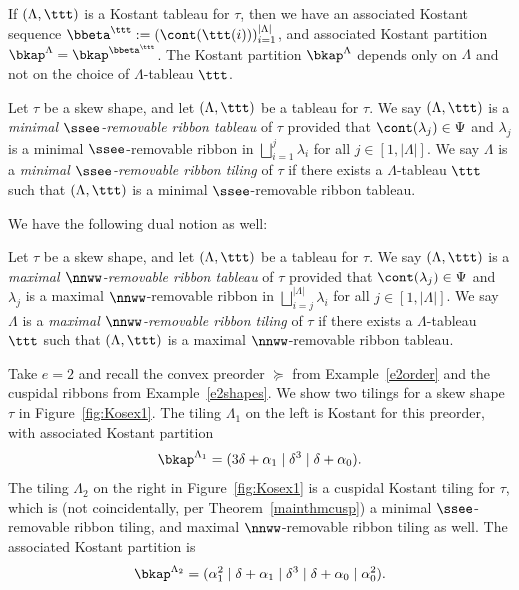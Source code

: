 If \((\Lambda,\ttt)\) is a Kostant tableau for \(\tau\), then we have an associated Kostant sequence \(\bbeta^{\ttt}:= (\cont(\ttt(i)))_{i=1}^{|\Lambda|}\), and associated Kostant partition \(\bkap^\Lambda = \bkap^{\bbeta^{\ttt}}\). The Kostant partition \(\bkap^\Lambda\) depends only on \(\Lambda\) and not on the choice of \(\Lambda\)-tableau \(\ttt\).

\begin{defi}
Let \(\tau\) be a skew shape, and let \((\Lambda,\ttt)\) be a tableau for \(\tau\). 
We say \((\Lambda,\ttt)\) is a {\em minimal \(\ssee\)-removable ribbon tableau} of \(\tau\) provided that \(\cont(\lambda_j) \in \Psi\) and \(\lambda_j\) is a minimal \(\ssee\)-removable ribbon in \(\bigsqcup_{i=1}^j \lambda_i\) for all \(j \in [1, |\Lambda|]\). We say \(\Lambda\) is a {\em minimal \(\ssee\)-removable ribbon tiling} of \(\tau\) if there exists a \(\Lambda\)-tableau \(\ttt\) such that \((\Lambda, \ttt)\) is a minimal \(\ssee\)-removable ribbon tableau.
\end{defi}

We have the following dual notion as well:

\begin{defi}
Let \(\tau\) be a skew shape, and let \((\Lambda,\ttt)\) be a tableau for \(\tau\). 
We say \((\Lambda,\ttt)\) is a {\em maximal \(\nnww\)-removable ribbon tableau} of \(\tau\) provided that \(\cont(\lambda_j) \in \Psi\) and \(\lambda_j\) is a maximal \(\nnww\)-removable ribbon in \(\bigsqcup_{i=j}^{|\Lambda|} \lambda_i\) for all \(j \in [1, |\Lambda|]\). We say \(\Lambda\) is a {\em maximal \(\nnww\)-removable ribbon tiling} of \(\tau\) if there exists a \(\Lambda\)-tableau \(\ttt\) such that \((\Lambda, \ttt)\) is a maximal \(\nnww\)-removable ribbon tableau.
\end{defi}

\begin{exam}\label{e2Kosex}
Take \(e=2\) and recall the convex preorder \(\succeq\) from Example~\ref{e2order} and the cuspidal ribbons from Example~\ref{e2shapes}. We show two tilings for a skew shape \(\tau\) in Figure~\ref{fig:Kosex1}. The tiling \(\Lambda_1\) on the left is Kostant for this preorder, with associated Kostant partition
\begin{align*}
\bkap^{\Lambda_1} = ( 3\delta + \alpha_1 \mid  \delta^3 \mid \delta + \alpha_0).
\end{align*}
The tiling \(\Lambda_2\) on the right in Figure~\ref{fig:Kosex1} is a cuspidal Kostant tiling for \(\tau\), which is (not coincidentally, per Theorem~\ref{mainthmcusp}) a minimal \(\ssee\)-removable ribbon tiling, and maximal \(\nnww\)-removable ribbon tiling as well. The associated Kostant partition is
\begin{align*}
\bkap^{\Lambda_2} = (\alpha_1^2 \mid \delta + \alpha_1 \mid  \delta^3 \mid \delta + \alpha_0 \mid \alpha_0^2).
\end{align*}
\end{exam}



